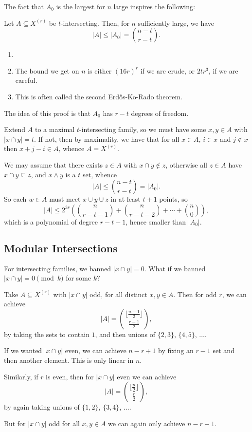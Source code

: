 \documentclass[12pt]{article}
\begin{document}
The fact that $A_0$ is the largest for $n$ large inspires the following:
\begin{theorem}
	Let $A \subseteq X^{(r)}$ be $t$-intersecting. Then, for $n$ sufficiently large, we have
	\[
		|A| \leq |A_0| = \binom{n-t}{r-t}.
	\]
\end{theorem}

\begin{remark}
	\begin{enumerate}
		\item[]
		\item The bound we get on $n$ is either $(16r)^r$ if we are crude, or $2tr^3$, if we are careful.
		\item This is often called the second Erd\H{o}s-Ko-Rado theorem.
	\end{enumerate}
\end{remark}

The idea of this proof is that $A_0$ has $r-t$ degrees of freedom.

\begin{proofbox}
	Extend $A$ to a maximal $t$-intersecting family, so we must have some $x, y \in A$ with $|x \cap y| = t$. If not, then by maximality, we have that for all $x \in A$, $i \in x$ and $j \not \in x$ then  $x + j - i \in A$, whence $A = X^{(r)}$.

	We may assume that there exists $z \in A$ with $x \cap y \not \in z$, otherwise all $z \in A$ have $x \cap y \subseteq z$, and $x \wedge y$ is a $t$ set, whence
	\[
		|A| \leq \binom{n-t}{r-t} = |A_0|.
	\]
	So each $w \in A$ must meet $x \cup y \cup z$ in at least $t + 1$ points, so
	\[
		|A| \leq 2^{3r} \left( \binom n{r-t-1} + \binom n{r-t-2} + \cdots + \binom n0\right),
	\]
	which is a polynomial of degree $r - t - 1$, hence smaller than $|A_0|$.
\end{proofbox}

\subsection{Modular Intersections}%
\label{sub:mis}

For intersecting families, we banned $|x \cap y| = 0$. What if we banned $|x \cap y| = 0 \pmod k$ for some $k$?

\begin{exbox}
	Take $A \subseteq X^{(r)}$ with $|x \cap y|$ odd, for all distinct $x, y \in A$. Then for odd $r$, we can achieve
	\[
		|A| = \binom{\lfloor \frac{n-1}{2} \rfloor}{\frac{r-1}{2}},
	\]
	by taking the sets to contain $1$, and then unions of $\{2, 3\}$, $\{4, 5\}$, $\ldots$.

	If we wanted $|x \cap y|$ even, we can achieve $n - r + 1$ by fixing an $r - 1$ set and then another element. This is only linear in $n$.

	Similarly, if $r$ is even, then for $|x \cap y|$ even we can achieve
	 \[
		 |A| = \binom{\lfloor \frac{n}{2} \rfloor}{\frac r2},
	\]
	by again taking unions of $\{1,2\}$, $\{3, 4\}$, $\ldots$.

	But for $|x \cap y|$ odd for all $x, y \in A$ we can again only achieve $n - r + 1$.
\end{exbox}
\end{document}
